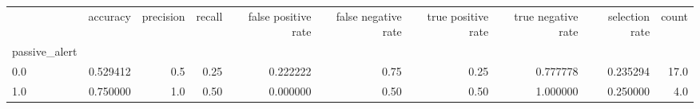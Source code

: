 \begin{tabular}{lrrrrrrrrr}
\toprule
{} &  accuracy &  precision &  recall &  false positive rate &  false negative rate &  true positive rate &  true negative rate &  selection rate &  count \\
passive\_alert &           &            &         &                      &                      &                     &                     &                 &        \\
\midrule
0.0           &  0.529412 &        0.5 &    0.25 &             0.222222 &                 0.75 &                0.25 &            0.777778 &        0.235294 &   17.0 \\
1.0           &  0.750000 &        1.0 &    0.50 &             0.000000 &                 0.50 &                0.50 &            1.000000 &        0.250000 &    4.0 \\
\bottomrule
\end{tabular}
